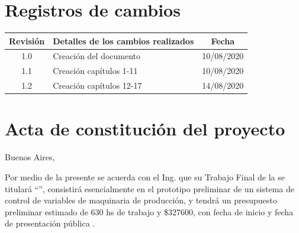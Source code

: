 \documentclass[11pt]{charter}
\begin{document}
\maketitle
\thispagestyle{empty}
\pagebreak


\thispagestyle{empty}
{\setlength{\parskip}{0pt}
\tableofcontents{}
}
\pagebreak


\section{Registros de cambios}
\label{sec:registro}


\begin{table}[ht]
\label{tab:registro}
\centering
\begin{tabularx}{\linewidth}{@{}|c|X|c|@{}}
\hline
\rowcolor[HTML]{C0C0C0} 
Revisión & \multicolumn{1}{c|}{\cellcolor[HTML]{C0C0C0}Detalles de los cambios realizados} & Fecha      \\ \hline
1.0      & Creación del documento                                          & 10/08/2020 \\ \hline
1.1 	 & Creación capítulos 1-11										   & 10/08/2020 \\ \hline
1.2 	 & Creación capítulos 12-17										   & 14/08/2020 \\ \hline
\end{tabularx}
\end{table}

\pagebreak



\section{Acta de constitución del proyecto}
\label{sec:acta}

\begin{flushright}
Buenos Aires, \fechaInicioName
\end{flushright}

\vspace{2cm}

Por medio de la presente se acuerda con el Ing. \authorname\hspace{1px} que su Trabajo Final de la \degreename\hspace{1px} se titulará ``\ttitle'', consistirá esencialmente en el prototipo preliminar de un sistema de control de variables de maquinaria de producción, y tendrá un presupuesto preliminar estimado de 630 hs de trabajo y \$327600, con fecha de inicio \fechaInicioName\hspace{1px} y fecha de presentación pública \fechaFinalName.
\end{document}
